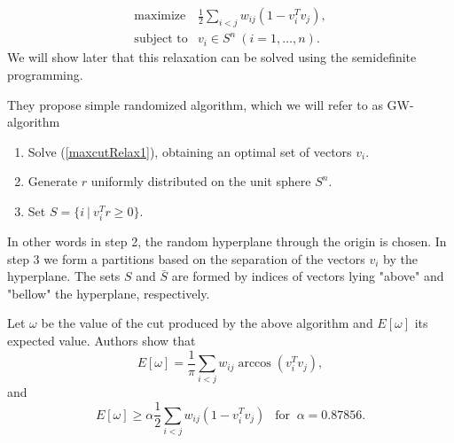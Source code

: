 \documentclass[12pt]{book}
\theoremstyle{definition}
\begin{document}
\begin{equation}
\label{maxcutRelax1}
\begin{array}{ll}
\mbox{maximize} & \frac{1}{2}\sum_{i<j}w_{ij}(1-v_i^Tv_j ), \\
\mbox{subject to} &  v_i \in S^n \ (i = 1,\dots ,n).
\end{array}
\end{equation}
We will show later that this relaxation can be solved using the semidefinite programming.

They propose simple randomized algorithm, which we will refer to as GW-algorithm
\begin{enumerate}
\item Solve (\ref{maxcutRelax1}), obtaining an optimal set of vectors $v_i$.
\item Generate $r$ uniformly distributed on the unit sphere $S^n$.
\item Set $S = \{i\ | \ v_i^Tr \geq 0\}.$
\end{enumerate}
In other words in step 2, the random hyperplane through the origin is chosen. In step 3 we form a partitions based on the separation of the vectors $v_i$ by the hyperplane. The sets $S$ and $\bar{S}$ are formed by indices of vectors lying "above" and "bellow" the hyperplane, respectively.

\prop 
\label{maxcutProp}
Let $\omega$ be the value of the cut produced by the above algorithm and $E[\omega]$ its expected value. Authors show that
\begin{equation}
\label{maxcutExp1}
E[\omega] = 	\frac{1}{\pi}\sum_{i<j}w_{ij}\arccos(v_i^Tv_j ), 
\end{equation}
and 
\begin{equation}
\label{maxcutExp2}
E[\omega]  \geq \alpha\frac{1}{2}\sum_{i<j}w_{ij}(1-v_i^Tv_j) \ \ \mbox{ for } \ \alpha = 0.87856.
\end{equation}
\end{document}
